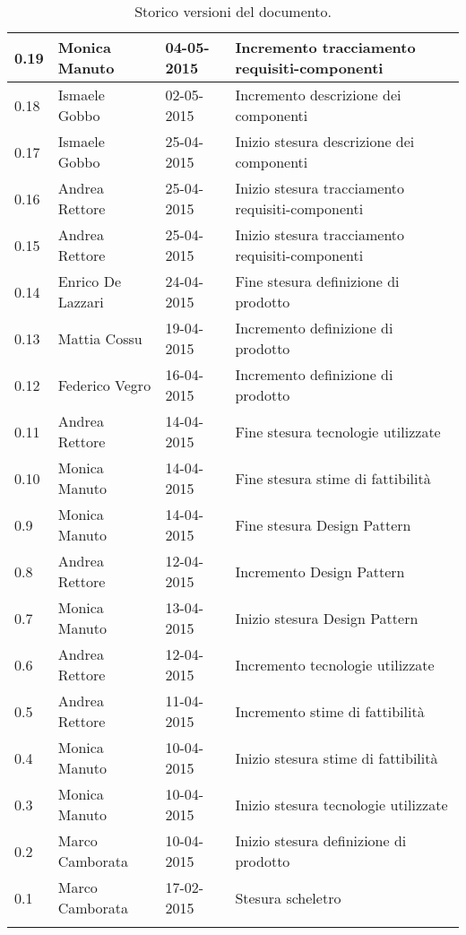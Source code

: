 \begin{longtable}{|l|l|l|p{}|}
\hline
0.19 & Monica Manuto & 04-05-2015 & Incremento tracciamento requisiti-componenti \\
\hline
0.18 & Ismaele Gobbo & 02-05-2015 & Incremento descrizione dei componenti \\
\hline
0.17 & Ismaele Gobbo & 25-04-2015 & Inizio stesura descrizione dei componenti \\
\hline
0.16 & Andrea Rettore & 25-04-2015 & Inizio stesura tracciamento requisiti-componenti \\
\hline
0.15 & Andrea Rettore & 25-04-2015 & Inizio stesura tracciamento requisiti-componenti \\
\hline
0.14 & Enrico De Lazzari & 24-04-2015 & Fine stesura definizione di prodotto \\
\hline
0.13 & Mattia Cossu & 19-04-2015 & Incremento definizione di prodotto \\
\hline
0.12 & Federico Vegro & 16-04-2015 & Incremento definizione di prodotto \\
\hline
0.11 & Andrea Rettore & 14-04-2015 & Fine stesura tecnologie utilizzate \\
\hline
0.10 & Monica Manuto & 14-04-2015 & Fine stesura stime di fattibilità \\
\hline
0.9 & Monica Manuto & 14-04-2015 & Fine stesura Design Pattern \\
\hline
0.8 & Andrea Rettore & 12-04-2015 & Incremento Design Pattern \\
\hline
0.7 & Monica Manuto & 13-04-2015 & Inizio stesura Design Pattern \\
\hline
0.6 & Andrea Rettore & 12-04-2015 & Incremento tecnologie utilizzate \\
\hline
0.5 & Andrea Rettore & 11-04-2015 & Incremento stime di fattibilità \\
\hline
0.4 & Monica Manuto & 10-04-2015 & Inizio stesura stime di fattibilità \\
\hline
0.3 & Monica Manuto & 10-04-2015 & Inizio stesura tecnologie utilizzate \\
\hline
0.2 & Marco Camborata & 10-04-2015 & Inizio stesura definizione di prodotto \\
\hline
0.1 & Marco Camborata & 17-02-2015 & Stesura scheletro \\
\hline
\caption{Storico versioni del documento.}
\end{longtable}
